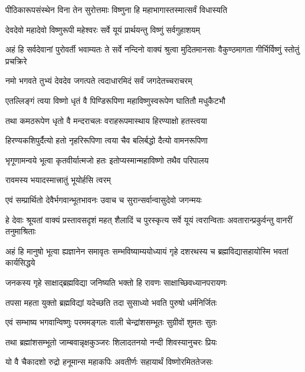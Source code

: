 \twolineshloka
{पीठिकारूपसंस्थेन विना तेन सुरोत्तमाः}
{विष्णुना हि महाभागास्तस्मात्सर्वं विधास्यति}%

\twolineshloka
{देवदेवो महादेवो विष्णुरूपी महेश्वरः}
{सर्वे यूयं प्रार्थयन्तु विष्णुं सर्वगुहाशयम्}%

\threelineshloka
{अहं हि सर्वदेवानां पुरोवर्ती भवाम्यतः}
{ते सर्वे नन्दिनो वाक्यं श्रुत्वा मुदितमानसाः}
{वैकुण्ठमागता गीर्भिर्विष्णुं स्तोतुं प्रचक्रिरे}%


\twolineshloka
{नमो भगवते तुभ्यं देवदेव जगत्पते}
{त्वदाधारमिदं सर्वं जगदेतच्चराचरम्}%

\twolineshloka
{एतल्लिङ्गं त्वया विष्णो धृतं वै पिण्डिरूपिणा}
{महाविष्णुस्वरूपेण घातितौ मधुकैटभौ}%

\twolineshloka
{तथा कमठरूपेण धृतो वै मन्दराचलः}
{वराहरूपमास्थाय हिरण्याक्षो हतस्त्वया}%

\twolineshloka
{हिरण्यकशिपुर्दैत्यो हतो नृहरिरूपिणा}
{त्वया चैव बलिर्बद्धो दैत्यो वामनरूपिणा}%

\twolineshloka
{भृगूणामन्वये भूत्वा कृतवीर्यात्मजो हतः}
{इतोप्यस्मान्महाविष्णो तथैव परिपालय}%

\onelineshloka
{रावमस्य भयादस्मात्त्रातुं भूयोर्हसि त्वरम्}%

\twolineshloka
{एवं सम्प्रार्थितो देवैर्भगवान्भूतभावनः}
{उवाच च सुरान्सर्वान्वासुदेवो जगन्मयः}%

\threelineshloka
{हे देवाः श्रूयतां वाक्यं प्रस्तावसदृशं महत्}
{शैलादिं च पुरस्कृत्य सर्वे यूयं त्वरान्विताः}
{अवतारान्प्रकुर्वन्तु वानरीं तनुमाश्रिताः}%

\threelineshloka
{अहं हि मानुषो भूत्वा ह्यज्ञानेन समावृतः}
{सम्भविष्याम्ययोध्यायं गृहे दशरथस्य च}
{ब्रह्मविद्यासहायोस्मि भवतां कार्यसिद्धये}%

\twolineshloka
{जनकस्य गृहे साक्षाद्ब्रह्मविद्या जनिष्यति}
{भक्तो हि रावणः साक्षाच्छिवध्यानपरायणः}%

\twolineshloka
{तपसा महता युक्तो ब्रह्मविद्यां यदेच्छति}
{तदा सुसाध्यो भवति पुरुषो धर्मनिर्जितः}%

\twolineshloka
{एवं सम्भाष्य भगवान्विष्णुः परममङ्गलः}
{वाली चेन्द्रांशसम्भूतः सुग्रीवों शुमतः सुतः}%

\twolineshloka
{तथा ब्रह्मांशसम्भूतो जाम्बवान्नृक्षकुञ्जरः}
{शिलादतनयो नन्दी शिवस्यानुचरः प्रियः}%

\twolineshloka
{यो वै चैकादशो रुद्रो हनूमान्स महाकपिः}
{अवतीर्णः सहायार्थं विष्णोरमिततेजसः}%

